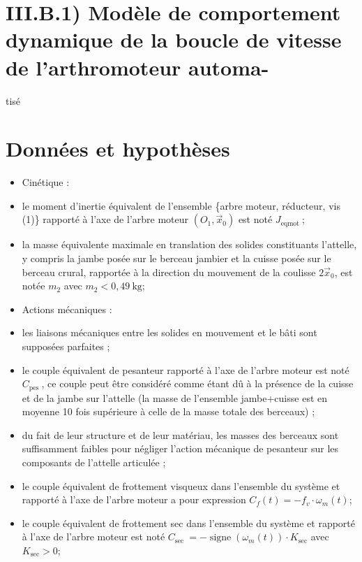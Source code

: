 \section*{III.B.1) Modèle de comportement dynamique de la boucle de vitesse de l'arthromoteur automa-}
 tisé\section*{Données et hypothèses}
\begin{itemize}
  \item Cinétique :

  \item le moment d'inertie équivalent de l'ensemble \{arbre moteur, réducteur, vis (1)\} rapporté à l'axe de l'arbre moteur $\left(O_{1}, \vec{x}_{0}\right)$ est noté $J_{\text {eqmot }}$;

  \item la masse équivalente maximale en translation des solides constituants l'attelle, y compris la jambe posée sur le berceau jambier et la cuisse posée sur le berceau crural, rapportée à la direction du mouvement de la coulisse $2 \vec{x}_{0}$, est notée $m_{2}$ avec $m_{2}<0,49 \mathrm{~kg}$;

  \item Actions mécaniques :

  \item les liaisons mécaniques entre les solides en mouvement et le bâti sont supposées parfaites ;

  \item le couple équivalent de pesanteur rapporté à l'axe de l'arbre moteur est noté $C_{\text {pes }}$, ce couple peut être considéré comme étant dû à la présence de la cuisse et de la jambe sur l'attelle (la masse de l'ensemble jambe+cuisse est en moyenne 10 fois supérieure à celle de la masse totale des berceaux) ;

  \item du fait de leur structure et de leur matériau, les masses des berceaux sont suffisamment faibles pour négliger l'action mécanique de pesanteur sur les composants de l'attelle articulée ;

  \item le couple équivalent de frottement visqueux dans l'ensemble du système et rapporté à l'axe de l'arbre moteur a pour expression $C_{f}(t)=-f_{v} \cdot \omega_{m}(t)$;

  \item le couple équivalent de frottement sec dans l'ensemble du système et rapporté à l'axe de l'arbre moteur est noté $C_{\text {sec }}=-\operatorname{signe}\left(\omega_{m}(t)\right) \cdot K_{\mathrm{sec}}$ avec $K_{\mathrm{sec}}>0$;

\end{itemize}


